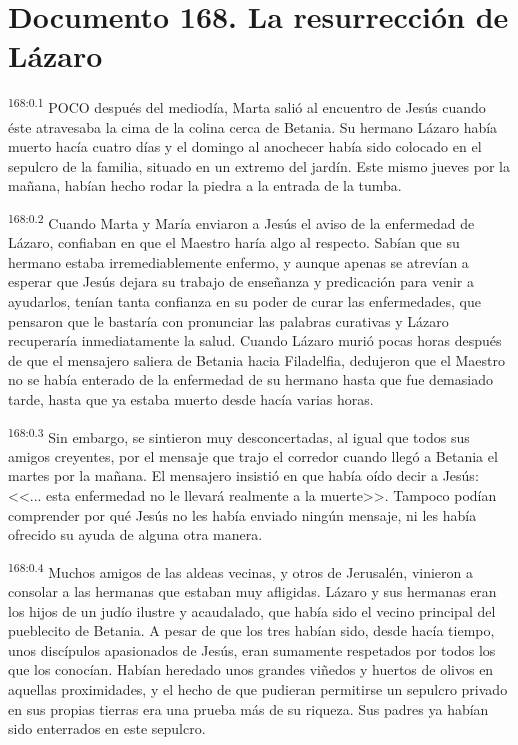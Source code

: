 \chapter{Documento 168. La resurrección de Lázaro}
\par 
\textsuperscript{168:0.1} POCO después del mediodía, Marta salió al encuentro de Jesús cuando éste atravesaba la cima de la colina cerca de Betania. Su hermano Lázaro había muerto hacía cuatro días y el domingo al anochecer había sido colocado en el sepulcro de la familia, situado en un extremo del jardín. Este mismo jueves por la mañana, habían hecho rodar la piedra a la entrada de la tumba.

\par 
\textsuperscript{168:0.2} Cuando Marta y María enviaron a Jesús el aviso de la enfermedad de Lázaro, confiaban en que el Maestro haría algo al respecto. Sabían que su hermano estaba irremediablemente enfermo, y aunque apenas se atrevían a esperar que Jesús dejara su trabajo de enseñanza y predicación para venir a ayudarlos, tenían tanta confianza en su poder de curar las enfermedades, que pensaron que le bastaría con pronunciar las palabras curativas y Lázaro recuperaría inmediatamente la salud. Cuando Lázaro murió pocas horas después de que el mensajero saliera de Betania hacia Filadelfia, dedujeron que el Maestro no se había enterado de la enfermedad de su hermano hasta que fue demasiado tarde, hasta que ya estaba muerto desde hacía varias horas.

\par 
\textsuperscript{168:0.3} Sin embargo, se sintieron muy desconcertadas, al igual que todos sus amigos creyentes, por el mensaje que trajo el corredor cuando llegó a Betania el martes por la mañana. El mensajero insistió en que había oído decir a Jesús: <<... esta enfermedad no le llevará realmente a la muerte>>. Tampoco podían comprender por qué Jesús no les había enviado ningún mensaje, ni les había ofrecido su ayuda de alguna otra manera.

\par 
\textsuperscript{168:0.4} Muchos amigos de las aldeas vecinas, y otros de Jerusalén, vinieron a consolar a las hermanas que estaban muy afligidas. Lázaro y sus hermanas eran los hijos de un judío ilustre y acaudalado, que había sido el vecino principal del pueblecito de Betania. A pesar de que los tres habían sido, desde hacía tiempo, unos discípulos apasionados de Jesús, eran sumamente respetados por todos los que los conocían. Habían heredado unos grandes viñedos y huertos de olivos en aquellas proximidades, y el hecho de que pudieran permitirse un sepulcro privado en sus propias tierras era una prueba más de su riqueza. Sus padres ya habían sido enterrados en este sepulcro.

